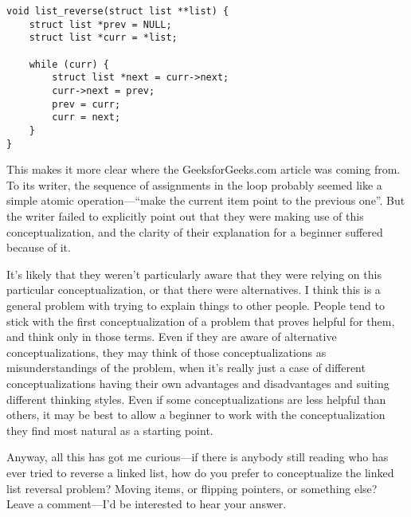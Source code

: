 \documentclass{amsart}
\begin{document}
\begin{verbatim}
void list_reverse(struct list **list) {
    struct list *prev = NULL;
    struct list *curr = *list;
    
    while (curr) {
        struct list *next = curr->next;
        curr->next = prev;
        prev = curr;
        curr = next;
    }
}
\end{verbatim}

This makes it more clear where the GeeksforGeeks.com article was coming from. To its writer, the sequence of assignments in the loop probably seemed like a simple atomic operation---``make the current item point to the previous one''. But the writer failed to explicitly point out that they were making use of this conceptualization, and the clarity of their explanation for a beginner suffered because of it.

It's likely that they weren't particularly aware that they were relying on this particular conceptualization, or that there were alternatives. I think this is a general problem with trying to explain things to other people. People tend to stick with the first conceptualization of a problem that proves helpful for them, and think only in those terms. Even if they are aware of alternative conceptualizations, they may think of those conceptualizations as misunderstandings of the problem, when it's really just a case of different conceptualizations having their own advantages and disadvantages and suiting different thinking styles. Even if some conceptualizations are less helpful than others, it may be best to allow a beginner to work with the conceptualization they find most natural as a starting point.

Anyway, all this has got me curious---if there is anybody still reading who has ever tried to reverse a linked list, how do you prefer to conceptualize the linked list reversal problem? Moving items, or flipping pointers, or something else? Leave a comment---I'd be interested to hear your answer.
\end{document}
